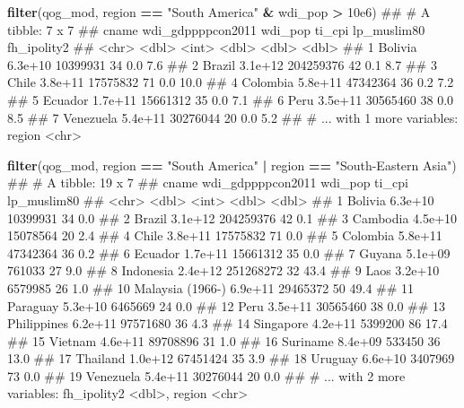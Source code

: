 \documentclass[]{book}
\newenvironment{Shaded}{\begin{snugshade}}{\end{snugshade}}
\newcommand{\KeywordTok}[1]{\textcolor[rgb]{0.13,0.29,0.53}{\textbf{#1}}}
\newcommand{\FloatTok}[1]{\textcolor[rgb]{0.00,0.00,0.81}{#1}}
\newcommand{\StringTok}[1]{\textcolor[rgb]{0.31,0.60,0.02}{#1}}
\newcommand{\OperatorTok}[1]{\textcolor[rgb]{0.81,0.36,0.00}{\textbf{#1}}}
\newcommand{\NormalTok}[1]{#1}
\begin{document}
\begin{Shaded}
\begin{Highlighting}[]
\KeywordTok{filter}\NormalTok{(qog_mod, region }\OperatorTok{==}\StringTok{ "South America"} \OperatorTok{&}\StringTok{ }\NormalTok{wdi_pop }\OperatorTok{>}\StringTok{ }\FloatTok{10e6}\NormalTok{)}
\NormalTok{## # A tibble: 7 x 7}
\NormalTok{##       cname wdi_gdppppcon2011   wdi_pop ti_cpi lp_muslim80 fh_ipolity2}
\NormalTok{##       <chr>             <dbl>     <int>  <dbl>       <dbl>       <dbl>}
\NormalTok{## 1   Bolivia           6.3e+10  10399931     34         0.0         7.6}
\NormalTok{## 2    Brazil           3.1e+12 204259376     42         0.1         8.7}
\NormalTok{## 3     Chile           3.8e+11  17575832     71         0.0        10.0}
\NormalTok{## 4  Colombia           5.8e+11  47342364     36         0.2         7.2}
\NormalTok{## 5   Ecuador           1.7e+11  15661312     35         0.0         7.1}
\NormalTok{## 6      Peru           3.5e+11  30565460     38         0.0         8.5}
\NormalTok{## 7 Venezuela           5.4e+11  30276044     20         0.0         5.2}
\NormalTok{## # ... with 1 more variables: region <chr>}

\KeywordTok{filter}\NormalTok{(qog_mod, region }\OperatorTok{==}\StringTok{ "South America"} \OperatorTok{|}\StringTok{ }\NormalTok{region }\OperatorTok{==}\StringTok{ "South-Eastern Asia"}\NormalTok{)}
\NormalTok{## # A tibble: 19 x 7}
\NormalTok{##               cname wdi_gdppppcon2011   wdi_pop ti_cpi lp_muslim80}
\NormalTok{##               <chr>             <dbl>     <int>  <dbl>       <dbl>}
\NormalTok{##  1          Bolivia           6.3e+10  10399931     34         0.0}
\NormalTok{##  2           Brazil           3.1e+12 204259376     42         0.1}
\NormalTok{##  3         Cambodia           4.5e+10  15078564     20         2.4}
\NormalTok{##  4            Chile           3.8e+11  17575832     71         0.0}
\NormalTok{##  5         Colombia           5.8e+11  47342364     36         0.2}
\NormalTok{##  6          Ecuador           1.7e+11  15661312     35         0.0}
\NormalTok{##  7           Guyana           5.1e+09    761033     27         9.0}
\NormalTok{##  8        Indonesia           2.4e+12 251268272     32        43.4}
\NormalTok{##  9             Laos           3.2e+10   6579985     26         1.0}
\NormalTok{## 10 Malaysia (1966-)           6.9e+11  29465372     50        49.4}
\NormalTok{## 11         Paraguay           5.3e+10   6465669     24         0.0}
\NormalTok{## 12             Peru           3.5e+11  30565460     38         0.0}
\NormalTok{## 13      Philippines           6.2e+11  97571680     36         4.3}
\NormalTok{## 14        Singapore           4.2e+11   5399200     86        17.4}
\NormalTok{## 15          Vietnam           4.6e+11  89708896     31         1.0}
\NormalTok{## 16         Suriname           8.4e+09    533450     36        13.0}
\NormalTok{## 17         Thailand           1.0e+12  67451424     35         3.9}
\NormalTok{## 18          Uruguay           6.6e+10   3407969     73         0.0}
\NormalTok{## 19        Venezuela           5.4e+11  30276044     20         0.0}
\NormalTok{## # ... with 2 more variables: fh_ipolity2 <dbl>, region <chr>}
\end{Highlighting}
\end{Shaded}
\end{document}
